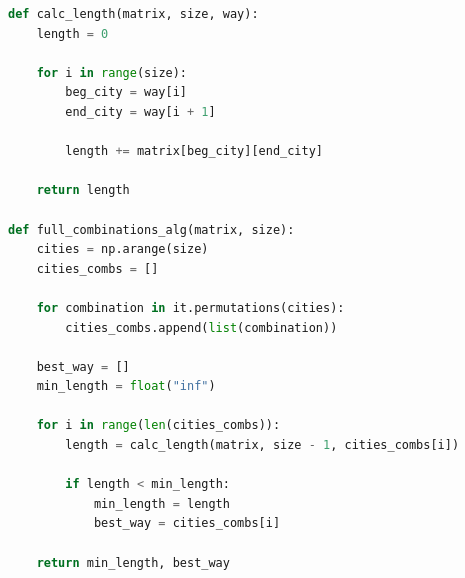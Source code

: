 \documentclass[a4paper,14pt, unknownkeysallowed]{extreport}
\begin{document}
\begin{lstlisting}[label=full_comb,caption=Реализация алгоритма полного перебора,language=Python]
def calc_length(matrix, size, way):
    length = 0

    for i in range(size):
        beg_city = way[i]
        end_city = way[i + 1]

        length += matrix[beg_city][end_city]

    return length

def full_combinations_alg(matrix, size):
    cities = np.arange(size)
    cities_combs = []

    for combination in it.permutations(cities):
        cities_combs.append(list(combination))

    best_way = []
    min_length = float("inf")

    for i in range(len(cities_combs)):
        length = calc_length(matrix, size - 1, cities_combs[i])

        if length < min_length:
            min_length = length
            best_way = cities_combs[i]

    return min_length, best_way
\end{lstlisting}

\clearpage
\end{document}
